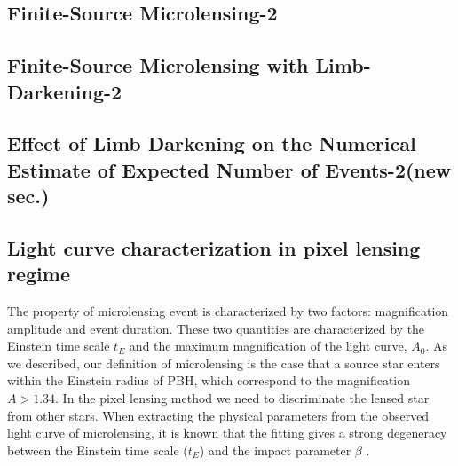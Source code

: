 \documentclass[iop, apj]{emulateapj}
\newcommand{\?}{\stackrel{?}{=}}
\begin{document}
\subsection{Finite-Source Microlensing-2}
\subsection{Finite-Source Microlensing with Limb-Darkening-2}
\subsection{Effect of Limb Darkening on the Numerical Estimate of Expected Number of Events-2(new sec.)}

\subsection{Light curve characterization in pixel lensing regime}
The property of microlensing event is characterized by two factors: magnification amplitude and event duration. These two quantities are characterized by the Einstein time scale $t_E$ and the maximum magnification of the light curve, $A_0$.
As we described, our definition of microlensing is the case that a source star enters within the Einstein radius of PBH, which correspond to the magnification $A>1.34$. In the pixel lensing method we need to discriminate the lensed star from other stars. 
When extracting the physical parameters from the observed light curve of microlensing, it is known that the fitting gives a strong degeneracy between the Einstein time scale ($t_E$) and the impact parameter $\beta$ \citep{Gould:96,BaltzSilk:00}. 
\end{document}
